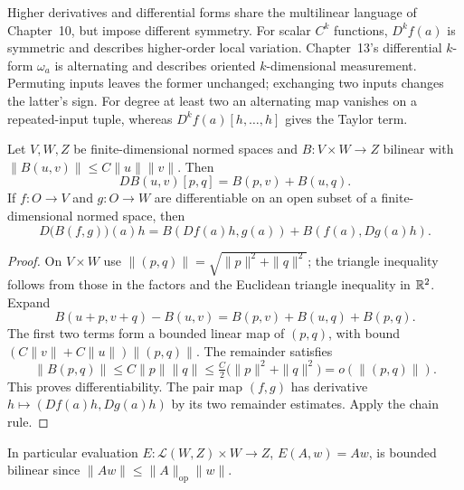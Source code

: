 \begin{remark}\label{rem:symmetric-alternating}
Higher derivatives and differential forms share the multilinear language
of Chapter~10, but impose different symmetry. For scalar $C^k$ functions,
$D^kf(a)$ is symmetric and describes higher-order local variation.
Chapter~13's differential $k$-form $\omega_a$ is alternating and describes
oriented $k$-dimensional measurement. Permuting inputs leaves the former
unchanged; exchanging two inputs changes the latter's sign.
For degree at least two an alternating map vanishes on a repeated-input
tuple, whereas $D^kf(a)[h,\ldots,h]$ gives the Taylor term.
\end{remark}

\begin{proposition}\label{prop:bilinear-derivative}
Let $V,W,Z$ be finite-dimensional normed spaces and $B:V\times W\to Z$
bilinear with $\|B(u,v)\|\leq C\|u\|\|v\|$. Then
\[
DB(u,v)[p,q]=B(p,v)+B(u,q).
\]
If $f:O\to V$ and $g:O\to W$ are differentiable on an open subset of
a finite-dimensional normed space, then
\[
D\bigl(B(f,g)\bigr)(a)h
=B(Df(a)h,g(a))+B(f(a),Dg(a)h).
\]
\end{proposition}
\begin{proof}
On $V\times W$ use $\|(p,q)\|=\sqrt{\|p\|^2+\|q\|^2}$;
the triangle inequality follows from those in the factors and the Euclidean
triangle inequality in $\mathbb{R}^2$. Expand
\[
B(u+p,v+q)-B(u,v)=B(p,v)+B(u,q)+B(p,q).
\]
The first two terms form a bounded linear map of $(p,q)$, with bound
$(C\|v\|+C\|u\|)\|(p,q)\|$. The remainder satisfies
\[
\|B(p,q)\|\leq C\|p\|\|q\|
\leq\tfrac C2\bigl(\|p\|^2+\|q\|^2\bigr)=o(\|(p,q)\|).
\]
This proves differentiability. The pair map $(f,g)$ has derivative
$h\mapsto(Df(a)h,Dg(a)h)$ by its two remainder estimates. Apply the chain rule.
\end{proof}
In particular evaluation $E:\mathcal L(W,Z)\times W\to Z$, $E(A,w)=Aw$,
is bounded bilinear since $\|Aw\|\leq\|A\|_{\mathrm{op}}\|w\|$.

